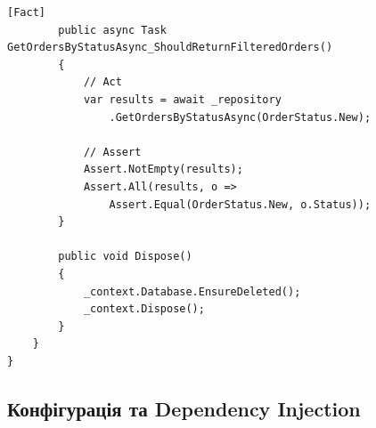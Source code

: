 \documentclass[14pt,a4paper]{extarticle}
\begin{document}
\begin{lstlisting}[language={[Sharp]C}, caption=Інтеграційні тести з базою даних, basicstyle=\small\ttfamily, breaklines=true, frame=single]
        [Fact]
        public async Task GetOrdersByStatusAsync_ShouldReturnFilteredOrders()
        {
            // Act
            var results = await _repository
                .GetOrdersByStatusAsync(OrderStatus.New);
            
            // Assert
            Assert.NotEmpty(results);
            Assert.All(results, o => 
                Assert.Equal(OrderStatus.New, o.Status));
        }
        
        public void Dispose()
        {
            _context.Database.EnsureDeleted();
            _context.Dispose();
        }
    }
}
\end{lstlisting}

\newpage
\subsection{Конфігурація та Dependency Injection}
\end{document}

